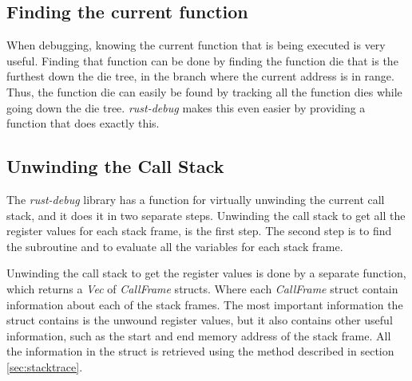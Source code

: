\subsection{Finding the current function} \label{sec:funcdie} %
When debugging, knowing the current function that is being executed is very useful.
Finding that function can be done by finding the function \gls{die} that is the furthest down the \gls{die} tree, in the branch where the current address is in range.
Thus, the function \gls{die} can easily be found by tracking all the function \glspl{die} while going down the \gls{die} tree.
\emph{rust-debug} makes this even easier by providing a function that does exactly this.


%
%
%
%


\subsection{Unwinding the Call Stack}

The \emph{rust-debug} library has a function for virtually unwinding the current call stack, and it does it in two separate steps.
Unwinding the call stack to get all the register values for each stack frame, is the first step.
The second step is to find the subroutine and to evaluate all the variables for each stack frame.


Unwinding the call stack to get the register values is done by a separate function, which returns a \emph{Vec} of \emph{CallFrame} structs.
Where each \emph{CallFrame} struct contain information about each of the stack frames.
The most important information the struct contains is the unwound register values, but it also contains other useful information, such as the start and end memory address of the stack frame.
All the information in the struct is retrieved using the method described in section \ref{sec:stacktrace}.


